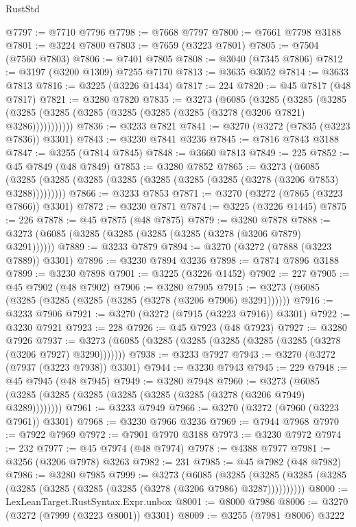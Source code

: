\begin{lexlean}{RustStd}
\begin{coremodule}
{\begin{coremodule}
{{{{{{{{{{{{{{{{{{{{{{{{{{{{{{{{{{{{{@7797 := @7710 @7796
@7798 := @7668 @7797
@7800 := @7661 @7798 @3188
@7801 := @3224 @7800
@7803 := @7659 (@3223 @7801)
@7805 := @7504 (@7560 @7803)
@7806 := @7401 @7805
@7808 := @3040 (@7345 @7806)
@7812 := @3197 (@3200 @1309) @7255 @7170
@7813 := @3635 @3052
@7814 := @3633 @7813
@7816 := @3225 (@3226 @1434)
@7817 := 224
@7820 := @45 @7817 (@48 @7817)
@7821 := @3280 @7820
@7835 := @3273
    (@6085
      (@3285
        (@3285
          (@3285 (@3285 (@3285 (@3285 (@3285 (@3285 (@3285 (@3278 (@3206 @7821) @3286)))))))))))
@7836 := @3233 @7821
@7841 := @3270 (@3272 (@7835 (@3223 @7836)) @3301)
@7843 := @3230 @7841 @3236
@7845 := @7816 @7843 @3188
@7847 := @3255 (@7814 @7845)
@7848 := @3660 @7813
@7849 := 225
@7852 := @45 @7849 (@48 @7849)
@7853 := @3280 @7852
@7865 := @3273
    (@6085 (@3285 (@3285 (@3285 (@3285 (@3285 (@3285 (@3285 (@3278 (@3206 @7853) @3288)))))))))
@7866 := @3233 @7853
@7871 := @3270 (@3272 (@7865 (@3223 @7866)) @3301)
@7872 := @3230 @7871
@7874 := @3225 (@3226 @1445)
@7875 := 226
@7878 := @45 @7875 (@48 @7875)
@7879 := @3280 @7878
@7888 := @3273 (@6085 (@3285 (@3285 (@3285 (@3285 (@3278 (@3206 @7879) @3291))))))
@7889 := @3233 @7879
@7894 := @3270 (@3272 (@7888 (@3223 @7889)) @3301)
@7896 := @3230 @7894 @3236
@7898 := @7874 @7896 @3188
@7899 := @3230 @7898
@7901 := @3225 (@3226 @1452)
@7902 := 227
@7905 := @45 @7902 (@48 @7902)
@7906 := @3280 @7905
@7915 := @3273 (@6085 (@3285 (@3285 (@3285 (@3285 (@3278 (@3206 @7906) @3291))))))
@7916 := @3233 @7906
@7921 := @3270 (@3272 (@7915 (@3223 @7916)) @3301)
@7922 := @3230 @7921
@7923 := 228
@7926 := @45 @7923 (@48 @7923)
@7927 := @3280 @7926
@7937 := @3273 (@6085 (@3285 (@3285 (@3285 (@3285 (@3285 (@3278 (@3206 @7927) @3290)))))))
@7938 := @3233 @7927
@7943 := @3270 (@3272 (@7937 (@3223 @7938)) @3301)
@7944 := @3230 @7943
@7945 := 229
@7948 := @45 @7945 (@48 @7945)
@7949 := @3280 @7948
@7960 := @3273 (@6085 (@3285 (@3285 (@3285 (@3285 (@3285 (@3285 (@3278 (@3206 @7949) @3289))))))))
@7961 := @3233 @7949
@7966 := @3270 (@3272 (@7960 (@3223 @7961)) @3301)
@7968 := @3230 @7966 @3236
@7969 := @7944 @7968
@7970 := @7922 @7969
@7972 := @7901 @7970 @3188
@7973 := @3230 @7972
@7974 := 232
@7977 := @45 @7974 (@48 @7974)
@7978 := @4388 @7977
@7981 := @3256 (@3206 @7978) @3263
@7982 := 231
@7985 := @45 @7982 (@48 @7982)
@7986 := @3280 @7985
@7999 := @3273
    (@6085
      (@3285 (@3285 (@3285 (@3285 (@3285 (@3285 (@3285 (@3285 (@3278 (@3206 @7986) @3287))))))))))
@8000 := LexLeanTarget.RustSyntax.Expr.unbox
@8001 := @8000 @7986
@8006 := @3270 (@3272 (@7999 (@3223 @8001)) @3301)
@8009 := @3255 (@7981 @8006) @3222
}}}}}}}}}}}}}}}}}}}}}}}}}}}}}}}}}}}}}
\end{coremodule}}
\end{coremodule}
\end{lexlean}
